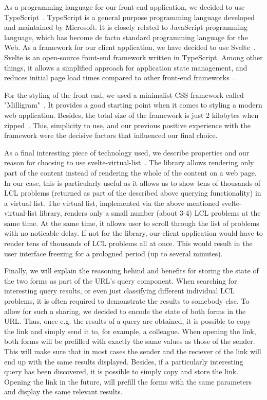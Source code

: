 As a programming language for our front-end application, we decided
to use TypeScript~\cite{TypeScript}. TypeScript is a general purpose
programming language developed and maintained by Microsoft. It is closely related to JavaScript programming language, which has become de facto standard programming language for the Web.
As a framework for our client application, we have decided to use
Svelte~\cite{Svelte}. Svelte is an open-source front-end framework
written in TypeScript. Among other things, it allows a simplified
approach for application state management, and reduces initial
page load times compared to other front-end frameworks~\cite{SvelteVsReactBundleSize}.

For the styling of the front end, we used a minimalist CSS framework
called "Milligram"~\cite{Milligram}. It provides a good starting point
when it comes to styling a modern web application. Besides, the total
size of the framework is just 2 kilobytes when zipped~\cite{Milligram}.
This, simplicity to use, and our previous positive experience with
the framework were the decisive factors that influenced our final
choice.

As a final interesting piece of technology used, we describe properties
and our reason for choosing to use svelte-virtual-list~\cite{svelte-virtual-list}.
The library allows rendering only part of the content instead of rendering
the whole of the content on a web page. In our case, this is
particularly useful as it allows us to
show tens of thousands of LCL problems (returned as part of the described above querying functionality) in a virtual list.
The virtual list, implemented via the above mentioned svelte-virtual-list library, renders only a small number (about 3-4)
LCL problems at the same time. At the same time, it allows user to
scroll through the list of problems with no noticable delay.
If not for the library, our client application would have to render
tens of thousands of LCL problems all at once. This would result in
the user interface freezing for a prologned period (up to several minutes).

Finally, we will explain the reasoning behind and benefits for
storing the state of the two forms as part of the URL's query
component. When searching for interesting query results, or even
just classifying different individual LCL problems, it is often
required to demonstrate the results to somebody else. To allow for such
a sharing, we decided to encode the state of both forms in the URL.
Thus, once e.g. the results of a query are obtained, it is possible
to copy the link and simply send it to, for example, a colleague.
When opening the link, both forms will be prefilled with
exactly the same values as those of the sender. This will make sure
that in most cases the sender and the reciever of the link will end
up with the same results displayed. Besides, if a particularly
interesting query has been discovered, it is possible to
simply copy and store the link. Opening the link in the future,
will prefill the forms with the same parameters and display
the same relevant results.

